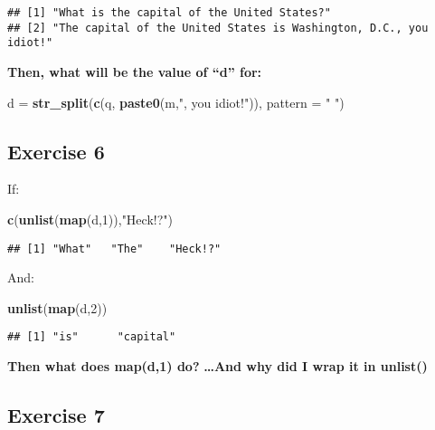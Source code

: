 \documentclass[]{article}
\newenvironment{Shaded}{\begin{snugshade}}{\end{snugshade}}
\newcommand{\DataTypeTok}[1]{\textcolor[rgb]{0.13,0.29,0.53}{#1}}
\newcommand{\DecValTok}[1]{\textcolor[rgb]{0.00,0.00,0.81}{#1}}
\newcommand{\KeywordTok}[1]{\textcolor[rgb]{0.13,0.29,0.53}{\textbf{#1}}}
\newcommand{\NormalTok}[1]{#1}
\newcommand{\StringTok}[1]{\textcolor[rgb]{0.31,0.60,0.02}{#1}}
\begin{document}
\begin{verbatim}
## [1] "What is the capital of the United States?"                       
## [2] "The capital of the United States is Washington, D.C., you idiot!"
\end{verbatim}

\textbf{Then, what will be the value of ``d'' for:}

\begin{Shaded}
\begin{Highlighting}[]
\NormalTok{d =}\StringTok{ }\KeywordTok{str_split}\NormalTok{(}\KeywordTok{c}\NormalTok{(q, }\KeywordTok{paste0}\NormalTok{(m,}\StringTok{", you idiot!"}\NormalTok{)), }\DataTypeTok{pattern =} \StringTok{" "}\NormalTok{)}
\end{Highlighting}
\end{Shaded}

\hypertarget{exercise-6}{%
\subsection{Exercise 6}\label{exercise-6}}

If:

\begin{Shaded}
\begin{Highlighting}[]
\KeywordTok{c}\NormalTok{(}\KeywordTok{unlist}\NormalTok{(}\KeywordTok{map}\NormalTok{(d,}\DecValTok{1}\NormalTok{)),}\StringTok{"Heck!?"}\NormalTok{)}
\end{Highlighting}
\end{Shaded}

\begin{verbatim}
## [1] "What"   "The"    "Heck!?"
\end{verbatim}

And:

\begin{Shaded}
\begin{Highlighting}[]
\KeywordTok{unlist}\NormalTok{(}\KeywordTok{map}\NormalTok{(d,}\DecValTok{2}\NormalTok{))}
\end{Highlighting}
\end{Shaded}

\begin{verbatim}
## [1] "is"      "capital"
\end{verbatim}

\textbf{Then what does map(d,1) do?} \textbf{\ldots{}And why did I wrap
it in unlist()}

\hypertarget{exercise-7}{%
\subsection{Exercise 7}\label{exercise-7}}
\end{document}
